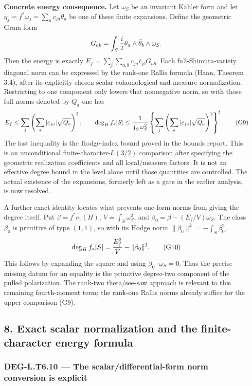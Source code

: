 \textbf{Concrete energy consequence.} Let \(\omega_S\) be an invariant Kähler form and let \(\eta_j=f^*\omega_j=\sum_a c_{ja}\theta_a\) be one of these finite expansions. Define the geometric Gram form \[
G_{ab}=\int_S {i\over2}\theta_a\wedge\bar\theta_b\wedge\omega_S.
\] Then the energy is exactly \(E_f=\sum_j\sum_{a,b}c_{ja}\bar c_{jb}G_{ab}\). Each full-Shimura-variety diagonal norm can be expressed by the rank-one Rallis formula (Haan, Theorem 3.4), after its explicitly chosen scalar-cohomological and measure normalization. Restricting to one component only lowers that nonnegative norm, so with those full norms denoted by \(Q_a\) one has \[
E_f\le\sum_j\left(\sum_a|c_{ja}|\sqrt{Q_a}\right)^2,
\qquad
\deg_H f_*[S]\le{1\over\int_S\omega_S^2}
\left\{\sum_j\left(\sum_a|c_{ja}|\sqrt{Q_a}\right)^2\right\}^{\!2}.
\tag{G9}
\] The last inequality is the Hodge-index bound proved in the bounds report. This is an unconditional finite-character-\(L(3/2)\) comparison after specifying the geometric realization coefficients and all local/measure factors. It is not an effective degree bound in the level alone until those quantities are controlled. The actual existence of the expansions, formerly left as a gate in the earlier analysis, is now resolved.

A further exact identity locates what prevents one-form norms from giving the degree itself. Put \(\beta=f^*c_1(H)\), \(V=\int_S\omega_S^2\), and \(\beta_0=\beta-(E_f/V)\omega_S\). The class \(\beta_0\) is primitive of type \((1,1)\), so with its Hodge norm \(\|\beta_0\|^2=-\int_S\beta_0^2\), \[
\deg_H f_*[S]={E_f^2\over V}-\|\beta_0\|^2.
\tag{G10}
\] This follows by expanding the square and using \(\beta_0\cdot\omega_S=0\). Thus the precise missing datum for an equality is the primitive degree-two component of the pulled polarization. The rank-two theta/see-saw approach is relevant to this remaining fourth-moment term; the rank-one Rallis norms already suffice for the upper comparison (G9).

\subsection{8. Exact scalar normalization and the finite-character energy formula}\label{exact-scalar-normalization-and-the-finite-character-energy-formula}

\subsubsection{DEG-L.T6.10 --- The scalar/differential-form norm conversion is explicit}\label{DEG-L.T6.10}

